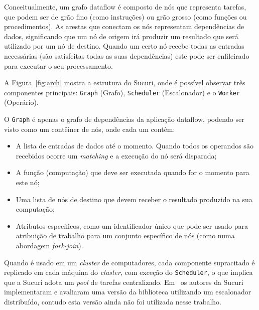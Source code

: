 Conceitualmente, um grafo dataflow é composto de nós que representa tarefas, que podem ser de grão fino (como instruções) ou grão grosso (como funções ou procedimentos).
As arestas que conectam os nós representam dependências de dados, significando que um nó de origem irá produzir um resultado que será utilizado por um nó de destino.
Quando um certo nó recebe todas as entradas necessárias (são satisfeitas todas as suas dependências) este pode ser enfileirado para executar o seu processamento.

A Figura~\ref{fig:arch} mostra a estrutura do Sucuri, onde é possível observar três componentes principais:
\texttt{Graph} (Grafo), \texttt{Scheduler} (Escalonador) e o \texttt{Worker} (Operário).

O \texttt{Graph} é apenas o grafo de dependências da aplicação dataflow, podendo ser visto como um contêiner de nós, onde cada um contêm:
\begin{itemize}
    \item{A lista de entradas de dados até o momento.
    Quando todos os operandos são recebidos ocorre um \emph{matching} e a execução do nó será disparada;}
    \item{A função (computação) que deve ser executada quando for o momento para este nó;}
    \item{Uma lista de nós de destino que devem receber o resultado produzido na sua computação;}
    \item{Atributos específicos, como um identificador único que pode ser usado para atribuição de trabalho para um conjunto específico de nós (como numa abordagem \emph{fork-join}).}
\end{itemize}

Quando é usado em um \emph{cluster} de computadores, cada componente supracitado é replicado em cada máquina do \emph{cluster}, com exceção do \texttt{Scheduler}, o que implica que a Sucuri adota um \emph{pool} de tarefas centralizado.
Em~\cite{sucuri-distribuida} os autores da Sucuri implementaram e avaliaram uma versão da biblioteca utilizando um escalonador distribuído, contudo esta versão ainda não foi utilizada nesse trabalho.

